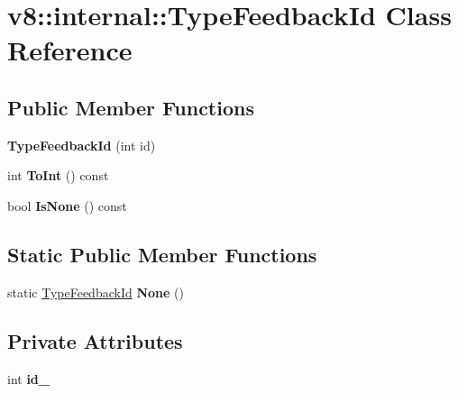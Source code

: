 \hypertarget{classv8_1_1internal_1_1_type_feedback_id}{}\section{v8\+:\+:internal\+:\+:Type\+Feedback\+Id Class Reference}
\label{classv8_1_1internal_1_1_type_feedback_id}
\subsection*{Public Member Functions}
\begin{DoxyCompactItemize}
\item 
{\bfseries Type\+Feedback\+Id} (int id)\hypertarget{classv8_1_1internal_1_1_type_feedback_id_a2315c0f9b1c764dd6f166a884ff624af}{}\label{classv8_1_1internal_1_1_type_feedback_id_a2315c0f9b1c764dd6f166a884ff624af}

\item 
int {\bfseries To\+Int} () const \hypertarget{classv8_1_1internal_1_1_type_feedback_id_a7e49e6953650d12499d41d715e95f413}{}\label{classv8_1_1internal_1_1_type_feedback_id_a7e49e6953650d12499d41d715e95f413}

\item 
bool {\bfseries Is\+None} () const \hypertarget{classv8_1_1internal_1_1_type_feedback_id_aedd453180b339ad171593afec6c765e3}{}\label{classv8_1_1internal_1_1_type_feedback_id_aedd453180b339ad171593afec6c765e3}

\end{DoxyCompactItemize}
\subsection*{Static Public Member Functions}
\begin{DoxyCompactItemize}
\item 
static \hyperlink{classv8_1_1internal_1_1_type_feedback_id}{Type\+Feedback\+Id} {\bfseries None} ()\hypertarget{classv8_1_1internal_1_1_type_feedback_id_a301d6c3d35acdf2cd4090d452bb6457f}{}\label{classv8_1_1internal_1_1_type_feedback_id_a301d6c3d35acdf2cd4090d452bb6457f}

\end{DoxyCompactItemize}
\subsection*{Private Attributes}
\begin{DoxyCompactItemize}
\item 
int {\bfseries id\+\_\+}\hypertarget{classv8_1_1internal_1_1_type_feedback_id_a2f1778c66b261c3352730c58c4048da7}{}\label{classv8_1_1internal_1_1_type_feedback_id_a2f1778c66b261c3352730c58c4048da7}

\end{DoxyCompactItemize}
